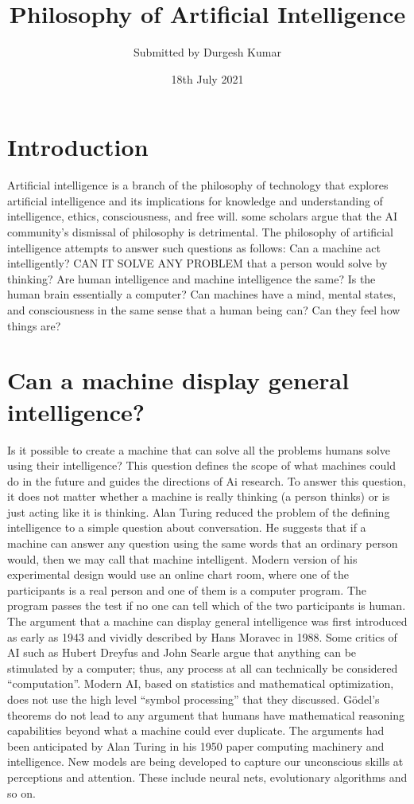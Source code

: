 \documentclass{article}
\title{Philosophy of Artificial Intelligence}
\author{Submitted by Durgesh Kumar}
\date{18th July 2021}
\begin{document}
\maketitle

\section{Introduction}
Artificial intelligence is a branch of the philosophy of technology that explores artificial intelligence and its implications for knowledge and understanding of intelligence, ethics, consciousness, and free will. some scholars argue that the AI community’s dismissal of philosophy is detrimental. The philosophy of artificial intelligence attempts to answer such questions as follows: Can a machine act intelligently? CAN IT SOLVE ANY PROBLEM that a person would solve by thinking? Are human intelligence and machine intelligence the same?
Is the human brain essentially a computer? Can machines have a mind, mental states, and consciousness in the same sense that a human being can? Can they feel how things are?
\section{Can a machine display general intelligence? }
Is it possible to create a machine that can solve all the problems humans solve using their intelligence? This question defines the scope of what machines could do in the future and guides the directions of Ai research. To answer this question, it does not matter whether a machine is really thinking (a person thinks) or is just acting like it is thinking.
Alan Turing reduced the problem of the defining intelligence to a simple question about conversation. He suggests that if a machine can answer any question using the same words that an ordinary person would, then we may call that machine intelligent. Modern version of his experimental design would use an online chart room, where one of the participants is a real person and one of them is a computer program. The program passes the test if no one can tell which of the two participants is human.
The argument that a machine can display general intelligence was first introduced as early as 1943 and vividly described by Hans Moravec in 1988. Some critics of AI such as Hubert Dreyfus and John Searle argue that anything can be stimulated by a computer; thus, any process at all can technically be considered “computation”.
Modern AI, based on statistics and mathematical optimization, does not use the high level “symbol processing” that they discussed. Gödel’s theorems do not lead to any argument that humans have mathematical reasoning capabilities beyond what a machine could ever duplicate. The arguments had been anticipated by Alan Turing in his 1950 paper computing machinery and intelligence. New models are being developed to capture our unconscious skills at perceptions and attention. These include neural nets, evolutionary algorithms and so on.
\end{document}
